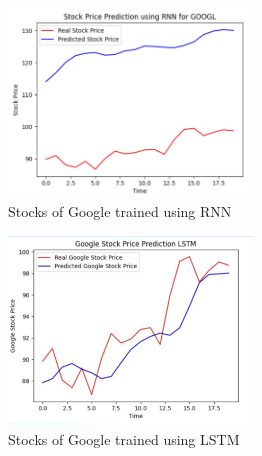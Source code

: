 \documentclass{article}
\begin{document}
\begin{figure}[htp]
    \centering
    \includegraphics[width=6.5cm]{GOOGL_RNN.jpg}
    \caption{Stocks of Google trained using RNN}
\end{figure}

\begin{figure}[htp]
    \centering
    \includegraphics[width=6.5cm]{GOOGL_LSTM.jpg}
    \caption{Stocks of Google trained using LSTM}
\end{figure}
\end{document}
